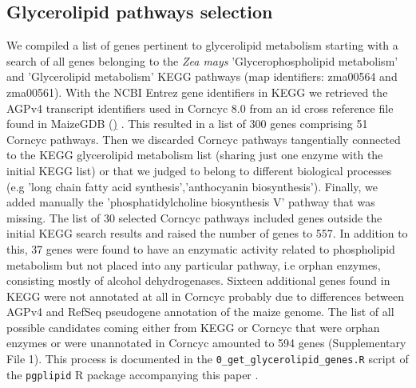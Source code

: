 \documentclass[9pt,twocolumn,twoside]{BioRxiv}
\begin{document}
\subsection{Glycerolipid pathways selection}
We compiled a list of genes pertinent to glycerolipid metabolism starting with a search of all genes belonging to the \textit{Zea mays} 'Glycerophospholipid metabolism' and 'Glycerolipid metabolism' KEGG pathways \cite{kanehisa2019} (map identifiers: zma00564 and zma00561). 
With the NCBI Entrez gene identifiers in KEGG we retrieved the AGPv4 transcript identifiers used in Corncyc 8.0 \cite{portwood2019, walsh2016} from an id cross reference file found in MaizeGDB (\href{https://www.maizegdb.org/search/gene/download_gene_xrefs.php?relative=v4}) \cite{portwood2019}.
This resulted in a list of 300 genes comprising 51 Corncyc pathways. 
Then we discarded Corncyc pathways  tangentially connected to the KEGG glycerolipid metabolism list (sharing just one enzyme with the initial KEGG list) or that we judged to belong to different biological processes (e.g 'long chain fatty acid synthesis','anthocyanin biosynthesis'). 
Finally, we added manually the 'phosphatidylcholine biosynthesis V' pathway that was missing. 
The list of 30 selected Corncyc pathways included genes outside the initial KEGG search results and raised the number of genes to 557. 
In addition to this, 37 genes were found to have an enzymatic activity related to phospholipid metabolism but not placed into any particular pathway, i.e orphan enzymes, consisting mostly of alcohol dehydrogenases. 
Sixteen additional genes found in KEGG were not annotated at all in Corncyc probably due to differences between AGPv4 and RefSeq pseudogene annotation of the maize genome. 
The list of all possible candidates coming either from KEGG or Corncyc that were orphan enzymes or were unannotated in Corncyc amounted to 594 genes (Supplementary File 1). 
This process is documented in the \verb|0_get_glycerolipid_genes.R| script of the \verb|pgplipid| R package accompanying this paper \cite{fausto_rodriguez_zapata_2020_4323410}.
\end{document}
